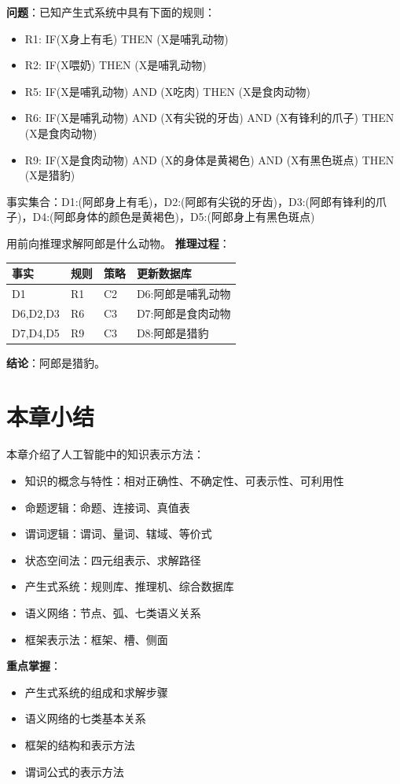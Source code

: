 \begin{examplebox}
\textbf{问题}：已知产生式系统中具有下面的规则：
\begin{itemize}[itemsep=0pt]
    \item R1: IF(X身上有毛) THEN (X是哺乳动物)
    \item R2: IF(X喂奶) THEN (X是哺乳动物)
    \item R5: IF(X是哺乳动物) AND (X吃肉) THEN (X是食肉动物)
    \item R6: IF(X是哺乳动物) AND (X有尖锐的牙齿) AND (X有锋利的爪子) THEN (X是食肉动物)
    \item R9: IF(X是食肉动物) AND (X的身体是黄褐色) AND (X有黑色斑点) THEN (X是猎豹)
\end{itemize}

事实集合：D1:(阿郎身上有毛)，D2:(阿郎有尖锐的牙齿)，D3:(阿郎有锋利的爪子)，D4:(阿郎身体的颜色是黄褐色)，D5:(阿郎身上有黑色斑点)

用前向推理求解阿郎是什么动物。
\tcblower
\textbf{推理过程}：

\begin{center}
\begin{tabular}{llll}
\toprule
\textbf{事实} & \textbf{规则} & \textbf{策略} & \textbf{更新数据库} \\
\midrule
D1 & R1 & C2 & D6:阿郎是哺乳动物 \\
D6,D2,D3 & R6 & C3 & D7:阿郎是食肉动物 \\
D7,D4,D5 & R9 & C3 & D8:阿郎是猎豹 \\
\bottomrule
\end{tabular}
\end{center}

\textbf{结论}：阿郎是猎豹。
\end{examplebox}

\section{本章小结}

本章介绍了人工智能中的知识表示方法：
\begin{itemize}[leftmargin=2em,itemsep=0pt]
    \item 知识的概念与特性：相对正确性、不确定性、可表示性、可利用性
    \item 命题逻辑：命题、连接词、真值表
    \item 谓词逻辑：谓词、量词、辖域、等价式
    \item 状态空间法：四元组表示、求解路径
    \item 产生式系统：规则库、推理机、综合数据库
    \item 语义网络：节点、弧、七类语义关系
    \item 框架表示法：框架、槽、侧面
\end{itemize}

\textbf{重点掌握}：
\begin{itemize}[leftmargin=2em,itemsep=0pt]
    \item 产生式系统的组成和求解步骤
    \item 语义网络的七类基本关系
    \item 框架的结构和表示方法
    \item 谓词公式的表示方法
\end{itemize}
